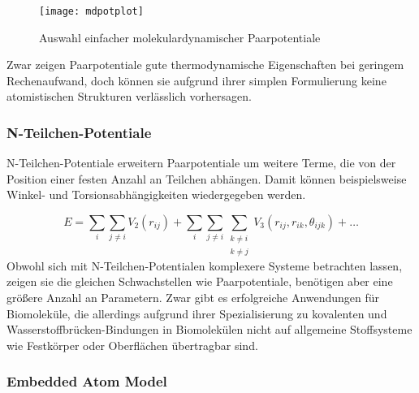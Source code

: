 \begin{figure}
  \centering
  \texttt{[image: mdpotplot]}
  \caption{Auswahl einfacher molekulardynamischer Paarpotentiale}
  \label{fig:mdpairpotentials}
\end{figure}

Zwar zeigen Paarpotentiale gute thermodynamische Eigenschaften bei geringem Rechenaufwand, doch können sie aufgrund ihrer simplen Formulierung keine atomistischen Strukturen verlässlich vorhersagen.

\subsubsection{N-Teilchen-Potentiale}

N-Teilchen-Potentiale erweitern Paarpotentiale um weitere Terme, die von der Position einer festen Anzahl an Teilchen abhängen.
Damit können beispielsweise Winkel- und Torsionsabhängigkeiten wiedergegeben werden.

\begin{equation}
  E = \sum_i\sum_{j \neq i}{V_2\left(r_{ij}\right)} + \sum_i\sum_{j \neq i}\sum_{\substack{k \neq i \\ k \neq j}}{V_3\left(r_{ij}, r_{ik}, \theta_{ijk}\right)} + \dots
\end{equation}
Obwohl sich mit N-Teilchen-Potentialen komplexere Systeme betrachten lassen, zeigen sie die gleichen Schwachstellen wie Paarpotentiale, benötigen aber eine größere Anzahl an Parametern.
Zwar gibt es erfolgreiche Anwendungen für Biomoleküle\cite{case_amber_2005,brooks_charmm:_1983,brooks_charmm:_2009,berendsen_gromacs:_1995,hess_gromacs_2008}, die allerdings aufgrund ihrer Spezialisierung zu kovalenten und Wasserstoffbrücken-Bindungen in Biomolekülen nicht auf allgemeine Stoffsysteme wie Festkörper oder Oberflächen übertragbar sind.

\subsubsection{Embedded Atom Model}

